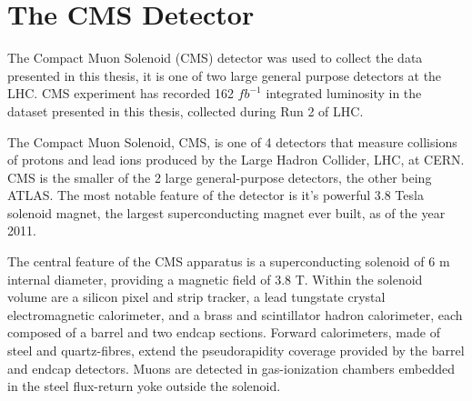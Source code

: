 \vspace{-3pt}
\section{The CMS Detector}\label{sec:CMSDetector}



The Compact Muon Solenoid (CMS) detector was used to collect the data presented in this thesis, it is one of two large general purpose detectors at the LHC. CMS experiment has recorded 162 $fb^{-1}$ integrated luminosity in the dataset presented in this thesis, collected during Run 2 of LHC.

The Compact Muon Solenoid, CMS, is one of 4 detectors that measure collisions of protons and lead ions produced by the Large Hadron Collider, LHC, at CERN. CMS is the smaller of the 2 large general-purpose detectors, the other being ATLAS. The most notable feature of the detector is it's powerful 3.8 Tesla solenoid magnet, the largest superconducting magnet ever built, as of the year 2011.


The central feature of the CMS apparatus is a superconducting solenoid of 6 m internal diameter, providing a magnetic field of 3.8 T. Within the solenoid volume are a silicon pixel and strip tracker, a lead tungstate crystal electromagnetic calorimeter, and a brass and scintillator hadron calorimeter, each composed of a barrel and two endcap sections. Forward calorimeters, made of steel and quartz-fibres, extend the pseudorapidity coverage provided by the barrel and endcap detectors. Muons are detected in gas-ionization chambers embedded in the steel flux-return yoke outside the solenoid. 



